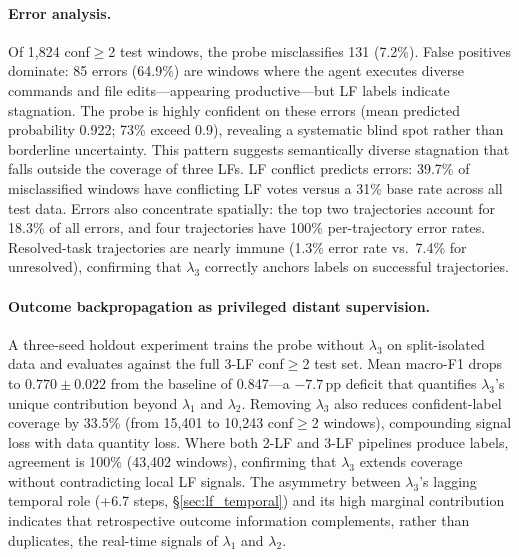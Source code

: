 \paragraph{Error analysis.}
Of 1{,}824 conf${\geq}$2 test windows, the probe misclassifies 131 (7.2\%).
False positives dominate: 85 errors (64.9\%) are windows where the agent executes diverse commands and file edits---appearing productive---but LF labels indicate stagnation.
The probe is highly confident on these errors (mean predicted probability 0.922; 73\% exceed 0.9), revealing a systematic blind spot rather than borderline uncertainty.
This pattern suggests semantically diverse stagnation that falls outside the coverage of three LFs.
LF conflict predicts errors: 39.7\% of misclassified windows have conflicting LF votes versus a 31\% base rate across all test data.
Errors also concentrate spatially: the top two trajectories account for 18.3\% of all errors, and four trajectories have 100\% per-trajectory error rates.
Resolved-task trajectories are nearly immune (1.3\% error rate vs.\ 7.4\% for unresolved), confirming that $\lambda_3$ correctly anchors labels on successful trajectories.

\paragraph{Outcome backpropagation as privileged distant supervision.}
A three-seed holdout experiment trains the probe without $\lambda_3$ on split-isolated data and evaluates against the full 3-LF conf${\geq}$2 test set.
Mean macro-F1 drops to $0.770{\pm}0.022$ from the baseline of 0.847---a $-7.7$\,pp deficit that quantifies $\lambda_3$'s unique contribution beyond $\lambda_1$ and $\lambda_2$.
Removing $\lambda_3$ also reduces confident-label coverage by 33.5\% (from 15{,}401 to 10{,}243 conf${\geq}$2 windows), compounding signal loss with data quantity loss.
Where both 2-LF and 3-LF pipelines produce labels, agreement is 100\% (43{,}402 windows), confirming that $\lambda_3$ extends coverage without contradicting local LF signals.
The asymmetry between $\lambda_3$'s lagging temporal role (+6.7 steps, \S\ref{sec:lf_temporal}) and its high marginal contribution indicates that retrospective outcome information complements, rather than duplicates, the real-time signals of $\lambda_1$ and $\lambda_2$.
